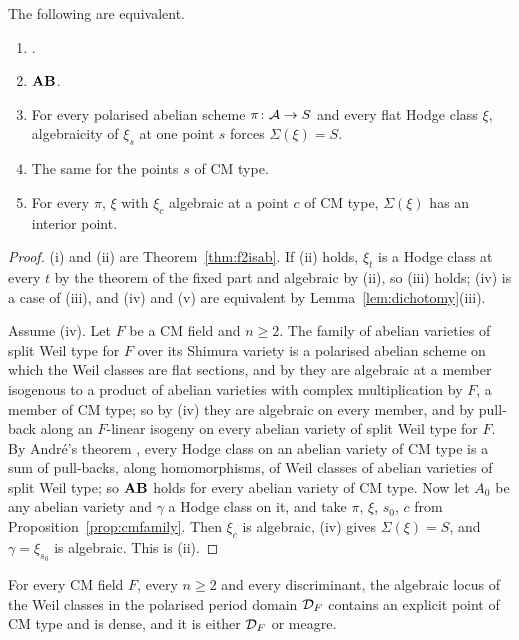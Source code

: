 \begin{theorem}\label{thm:propagation}
The following are equivalent.
\begin{enumerate}[label=\textup{(\roman*)},leftmargin=2.4em,itemsep=2pt]
\item \Fii{}.
\item $\mathbf{AB}$.
\item For every polarised abelian scheme $\pi\colon\mathcal{A}\to S$ and every flat Hodge class $\xi$, algebraicity of $\xi_{s}$ at one point $s$ forces $\Sigma(\xi)=S$.
\item The same for the points $s$ of CM type.
\item For every $\pi$, $\xi$ with $\xi_{c}$ algebraic at a point $c$ of CM type, $\Sigma(\xi)$ has an interior point.
\end{enumerate}
\end{theorem}

\begin{proof}
(i) and (ii) are Theorem~\ref{thm:f2isab}. If (ii) holds, $\xi_{t}$ is a Hodge class at every $t$ by the theorem of the fixed part and algebraic by (ii), so (iii) holds; (iv) is a case of (iii), and (iv) and (v) are equivalent by Lemma~\ref{lem:dichotomy}(iii).

Assume (iv). Let $F$ be a CM field and $n\ge2$. The family of abelian varieties of split Weil type for $F$ over its Shimura variety is a polarised abelian scheme on which the Weil classes are flat sections, and by \cite[Thm.~1.1(i)]{BMB26} they are algebraic at a member isogenous to a product of abelian varieties with complex multiplication by $F$, a member of CM type; so by (iv) they are algebraic on every member, and by pull-back along an $F$-linear isogeny on every abelian variety of split Weil type for $F$. By Andr\'e's theorem \cite{And92cm}, every Hodge class on an abelian variety of CM type is a sum of pull-backs, along homomorphisms, of Weil classes of abelian varieties of split Weil type; so $\mathbf{AB}$ holds for every abelian variety of CM type. Now let $A_{0}$ be any abelian variety and $\gamma$ a Hodge class on it, and take $\pi$, $\xi$, $s_{0}$, $c$ from Proposition~\ref{prop:cmfamily}. Then $\xi_{c}$ is algebraic, (iv) gives $\Sigma(\xi)=S$, and $\gamma=\xi_{s_{0}}$ is algebraic. This is (ii).
\end{proof}

\begin{proposition}\label{prop:weil-dense}
For every CM field $F$, every $n\ge2$ and every discriminant, the algebraic locus of the Weil classes in the polarised period domain $\mathcal{D}_{F}$ contains an explicit point of CM type and is dense, and it is either $\mathcal{D}_{F}$ or meagre.
\end{proposition}

